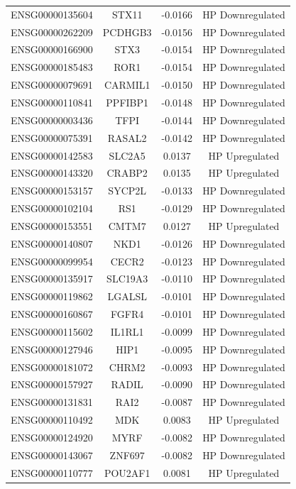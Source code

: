 \documentclass[
]{article}
\begin{document}
\begin{singlespace}
\begin{longtable}[t]{lccc}
ENSG00000135604 & STX11 & -0.0166 & HP Downregulated\\
\addlinespace
ENSG00000262209 & PCDHGB3 & -0.0156 & HP Downregulated\\
ENSG00000166900 & STX3 & -0.0154 & HP Downregulated\\
ENSG00000185483 & ROR1 & -0.0154 & HP Downregulated\\
ENSG00000079691 & CARMIL1 & -0.0150 & HP Downregulated\\
ENSG00000110841 & PPFIBP1 & -0.0148 & HP Downregulated\\
\addlinespace
ENSG00000003436 & TFPI & -0.0144 & HP Downregulated\\
ENSG00000075391 & RASAL2 & -0.0142 & HP Downregulated\\
ENSG00000142583 & SLC2A5 & 0.0137 & HP Upregulated\\
ENSG00000143320 & CRABP2 & 0.0135 & HP Upregulated\\
ENSG00000153157 & SYCP2L & -0.0133 & HP Downregulated\\
\addlinespace
ENSG00000102104 & RS1 & -0.0129 & HP Downregulated\\
ENSG00000153551 & CMTM7 & 0.0127 & HP Upregulated\\
ENSG00000140807 & NKD1 & -0.0126 & HP Downregulated\\
ENSG00000099954 & CECR2 & -0.0123 & HP Downregulated\\
ENSG00000135917 & SLC19A3 & -0.0110 & HP Downregulated\\
\addlinespace
ENSG00000119862 & LGALSL & -0.0101 & HP Downregulated\\
ENSG00000160867 & FGFR4 & -0.0101 & HP Downregulated\\
ENSG00000115602 & IL1RL1 & -0.0099 & HP Downregulated\\
ENSG00000127946 & HIP1 & -0.0095 & HP Downregulated\\
ENSG00000181072 & CHRM2 & -0.0093 & HP Downregulated\\
\addlinespace
ENSG00000157927 & RADIL & -0.0090 & HP Downregulated\\
ENSG00000131831 & RAI2 & -0.0087 & HP Downregulated\\
ENSG00000110492 & MDK & 0.0083 & HP Upregulated\\
ENSG00000124920 & MYRF & -0.0082 & HP Downregulated\\
ENSG00000143067 & ZNF697 & -0.0082 & HP Downregulated\\
\addlinespace
ENSG00000110777 & POU2AF1 & 0.0081 & HP Upregulated\\

\end{longtable}
\end{singlespace}
\end{document}
